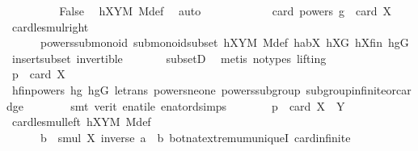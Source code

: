 \begin{isabellebody}
\ \ \ \ \ \ \isamarkupfalse%
\ \isamarkupfalse%
\ False\ \isamarkupfalse%
\ hXYM\ M{\isacharunderscore}{\kern0pt}def\ \isamarkupfalse%
\ auto\isanewline
\ \ \ \ \isamarkupfalse%
\isanewline
\ \ \ \ \isamarkupfalse%
\ \isamarkupfalse%
\ {\isachardoublequoteopen}card\ {\isacharparenleft}{\kern0pt}powers\ g{\isacharparenright}{\kern0pt}\ {\isasymle}\ card\ X{\isachardoublequoteclose}\ \isamarkupfalse%
\ card{\isacharunderscore}{\kern0pt}le{\isacharunderscore}{\kern0pt}smul{\isacharunderscore}{\kern0pt}right\ \isanewline
\ \ \ \ \ \ powers{\isacharunderscore}{\kern0pt}submonoid\ submonoid{\isachardot}{\kern0pt}subset\ hXYM\ M{\isacharunderscore}{\kern0pt}def\ habX\ hXG\ hXfin\ hgG\ insert{\isacharunderscore}{\kern0pt}subset\ invertible\ \isanewline
\ \ \ \ \ \ subsetD\ \isamarkupfalse%
\ {\isacharparenleft}{\kern0pt}metis\ {\isacharparenleft}{\kern0pt}no{\isacharunderscore}{\kern0pt}types{\isacharcomma}{\kern0pt}\ lifting{\isacharparenright}{\kern0pt}{\isacharparenright}{\kern0pt}\isanewline
\ \ \ \ \isamarkupfalse%
\ \isamarkupfalse%
\ {\isachardoublequoteopen}p\ {\isasymle}\ card\ X{\isachardoublequoteclose}\ \isanewline
\ \ \ \ \ \ \isamarkupfalse%
\ hfinpowers\ hg{}\ hgG\ le{\isacharunderscore}{\kern0pt}trans\ powers{\isacharunderscore}{\kern0pt}ne{\isacharunderscore}{\kern0pt}one\ powers{\isacharunderscore}{\kern0pt}subgroup\ subgroup{\isacharunderscore}{\kern0pt}infinite{\isacharunderscore}{\kern0pt}or{\isacharunderscore}{\kern0pt}card{\isacharunderscore}{\kern0pt}ge\isanewline
\ \ \ \ \ \ \isamarkupfalse%
\ {\isacharparenleft}{\kern0pt}smt\ {\isacharparenleft}{\kern0pt}verit{\isacharparenright}{\kern0pt}\ enat{\isacharunderscore}{\kern0pt}ile\ enat{\isacharunderscore}{\kern0pt}ord{\isacharunderscore}{\kern0pt}simps{\isacharparenleft}{\kern0pt}{}{\isacharparenright}{\kern0pt}{\isacharparenright}{\kern0pt}\isanewline
\ \ \ \ \isamarkupfalse%
\ \isamarkupfalse%
\ {\isachardoublequoteopen}p\ {\isasymle}\ card\ {\isacharparenleft}{\kern0pt}X\ {\isasymcdots}\ Y{\isacharparenright}{\kern0pt}{\isachardoublequoteclose}\ \isamarkupfalse%
\ card{\isacharunderscore}{\kern0pt}le{\isacharunderscore}{\kern0pt}smul{\isacharunderscore}{\kern0pt}left\ hXYM\ M{\isacharunderscore}{\kern0pt}def\ \isanewline
\ \ \ \ \ \ {\isacartoucheopen}b\ {\isasymin}\ smul\ X\ {\isacharbraceleft}{\kern0pt}inverse\ a\ {\isasymcdot}\ b{\isacharbraceright}{\kern0pt}{\isacartoucheclose}\ bot{\isacharunderscore}{\kern0pt}nat{\isacharunderscore}{\kern0pt}{}{\isachardot}{\kern0pt}extremum{\isacharunderscore}{\kern0pt}uniqueI\ card{\isachardot}{\kern0pt}infinite\ \isanewline

\end{isabellebody}
